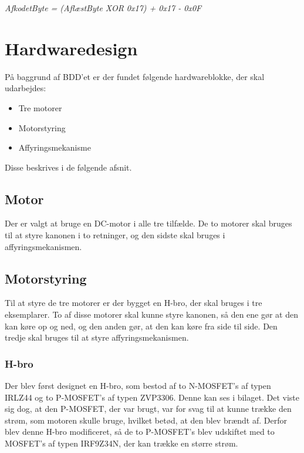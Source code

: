\textit{AfkodetByte = (AflæstByte XOR 0x17) + 0x17 - 0x0F}

\section{Hardwaredesign}
På baggrund af BDD'et er der fundet følgende hardwareblokke, der skal udarbejdes: 

\begin{itemize}
	\item Tre motorer
	\item Motorstyring
	\item Affyringsmekanisme 
\end{itemize}

Disse beskrives i de følgende afsnit. 

\subsection{Motor}
Der er valgt at bruge en DC-motor i alle tre tilfælde. De to motorer skal bruges til at styre kanonen i to retninger, og den sidste skal bruges i affyringsmekanismen. 

\subsection{Motorstyring}
Til at styre de tre motorer er der bygget en H-bro, der skal bruges i tre eksemplarer. To af disse motorer skal kunne styre kanonen, så den ene gør at den kan køre op og ned, og den anden gør, at den kan køre fra side til side. Den tredje skal bruges til at styre affyringsmekanismen. 

\subsubsection{H-bro}
Der blev først designet en H-bro, som bestod af to N-MOSFET's af typen IRLZ44 og to P-MOSFET's af typen ZVP3306. Denne kan ses i bilaget. Det viste sig dog, at den P-MOSFET, der var brugt, var for svag til at kunne trække den strøm, som motoren skulle bruge, hvilket betød, at den blev brændt af. Derfor blev denne H-bro modificeret, så de to P-MOSFET's blev udskiftet med to MOSFET's af typen IRF9Z34N, der kan trække en større strøm. 

